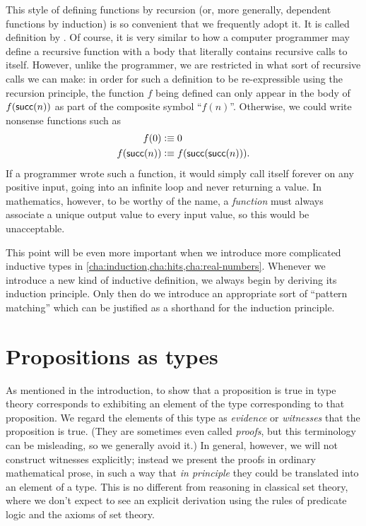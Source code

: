 This style of defining functions by recursion (or, more generally, dependent functions by induction) is so convenient that we frequently adopt it.
It is called definition by .
Of course, it is very similar to how a computer programmer may define a recursive function with a body that literally contains recursive calls to itself.
However, unlike the programmer, we are restricted in what sort of recursive calls we can make: in order for such a definition to be re-expressible using the recursion principle, the function $f$ being defined can only appear in the body of $f(\mathsf{succ}(n))$ as part of the composite symbol ``$f(n)$''.
Otherwise, we could write nonsense functions such as
\begin{align*}
  f(0)&\vcentcolon\equiv 0\\
  f(\mathsf{succ}(n)) &\vcentcolon\equiv f(\mathsf{succ}(\mathsf{succ}(n))).
\end{align*}
If a programmer wrote such a function, it would simply call itself forever on any positive input, going into an infinite loop and never returning a value.
In mathematics, however, to be worthy of the name, a \emph{function} must always associate a unique output value to every input value, so this would be unacceptable.

This point will be even more important when we introduce more complicated inductive types in \autoref{cha:induction,cha:hits,cha:real-numbers}.
Whenever we introduce a new kind of inductive definition, we always begin by deriving its induction principle.
Only then do we introduce an appropriate sort of ``pattern matching'' which can be justified as a shorthand for the induction principle.

%
%

\section{Propositions as types}
\label{sec:pat}

%
%
As mentioned in the introduction, to show that a proposition is true in type theory corresponds to exhibiting an element of the type corresponding to that proposition.
%
%
We regard the elements of this type as \emph{evidence} or \emph{witnesses} that the proposition is true. (They are sometimes even called \emph{proofs}, but this terminology can be misleading, so we generally avoid it.)
In general, however, we will not construct witnesses explicitly; instead we present the proofs in ordinary mathematical prose, in such a way that \emph{in principle} they could be translated into an element of a type.
This is no different from reasoning in classical set theory, where we don't expect to see an explicit derivation using the rules of predicate logic and the axioms of set theory.

